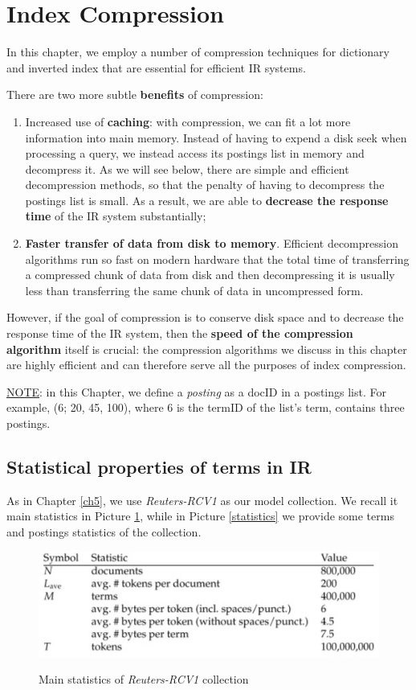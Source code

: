 \section{Index Compression}\label{ch6}
In this chapter, we employ a number of compression techniques for dictionary and inverted index that are essential for efficient IR systems.

There are two more subtle \textbf{benefits} of compression:

\begin{enumerate}
    \item Increased use of \textbf{caching}: with compression, we can fit a lot more information into main memory. Instead of having to expend a disk seek when processing a query, we instead access its postings list in memory and decompress it. As we will see below, there are simple and efficient decompression methods, so that the penalty of having to decompress the postings list is small. As a result, we are able to \textbf{decrease the response time} of the IR system substantially;
    \item \textbf{Faster transfer of data from disk to memory}. Efficient decompression algorithms run so fast on modern hardware that the total time of transferring a compressed chunk of data from disk and then decompressing it is usually less than transferring the same chunk of data in uncompressed form.
\end{enumerate}

However, if the goal of compression is to conserve disk space and to decrease the response time of the IR system, then the \textbf{speed of the compression algorithm} itself is crucial: the compression algorithms we discuss in this chapter are highly efficient and can therefore serve all the purposes of index compression.

\underline{NOTE}: in this Chapter, we define a \textit{posting} as a docID in a postings list. For example, (6; 20, 45, 100), where 6 is the termID of the list's term, contains three postings.

\subsection{Statistical properties of terms in IR}
As in Chapter \ref{ch5}, we use \textit{Reuters-RCV1} as our model collection. We recall it main statistics in Picture \ref{reuters}, while in Picture \ref{statistics} we provide some terms and postings statistics of the collection.

\begin{figure}[h!]
		\centering
		\includegraphics[scale = 1.5]{img/reuters.jpg}
		\label{reuters}
        \caption{Main statistics of \textit{Reuters-RCV1} collection}
\end{figure}

